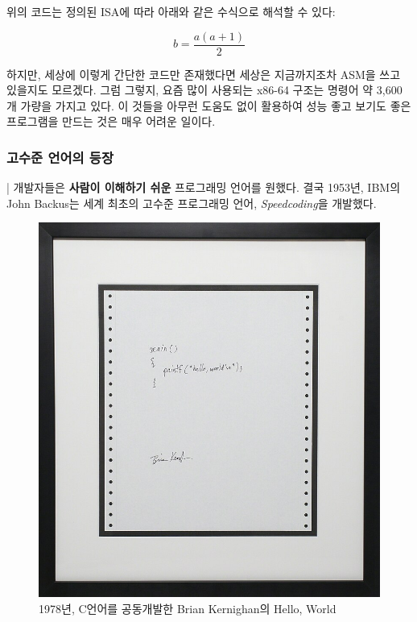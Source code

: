 \documentclass{article}
\begin{document}
위의 코드는 정의된 ISA에 따라 아래와 같은 수식으로 해석할 수 있다:

\begin{equation}
b = \frac{a(a + 1)}{2}
\end{equation}

하지만, 세상에 이렇게 간단한 코드만 존재했다면 세상은 지금까지조차 ASM을
쓰고 있을지도 모르겠다.
그럼 그렇지, 요즘 많이 사용되는 x86-64 구조는 명령어 약 3,600개 가량을
가지고 있다.
이 것들을 아무런 도움도 없이 활용하여 성능 좋고 보기도 좋은 프로그램을
만드는 것은 매우 어려운 일이다.

\subsubsection{고수준 언어의 등장}

| 개발자들은 \textbf{사람이 이해하기 쉬운} 프로그래밍 언어를 원했다.
결국 1953년, IBM의 John Backus는 세계 최초의 고수준 프로그래밍 언어,
\textit{Speedcoding}을 개발했다.

\begin{figure}[!h]
    \centering
    \includegraphics[width=\linewidth]{images/hello-world.jpg}
    \caption{1978년, C언어를 공동개발한 Brian Kernighan의 Hello, World}
\end{figure}
\end{document}
